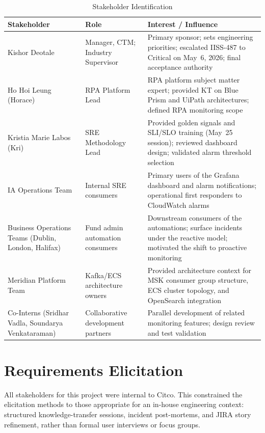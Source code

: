 \begin{table}[ht]
\centering
\caption{Stakeholder Identification}
\label{tab:stakeholders}
\begin{tabular}{p{3.8cm}p{3.0cm}p{5.5cm}}
\toprule
\textbf{Stakeholder} & \textbf{Role} & \textbf{Interest / Influence} \\
\midrule
Kishor Deotale & Manager, CTM; Industry Supervisor & Primary sponsor; sets engineering priorities; escalated IISS-487 to Critical on May~6, 2026; final acceptance authority \\
\midrule
Ho Hoi Leung (Horace) & RPA Platform Lead & RPA platform subject matter expert; provided KT on Blue Prism and UiPath architectures; defined RPA monitoring scope \\
\midrule
Kristia Marie Labos (Kri) & SRE Methodology Lead & Provided golden signals and SLI/SLO training (May~25 session); reviewed dashboard design; validated alarm threshold selection \\
\midrule
IA Operations Team & Internal SRE consumers & Primary users of the Grafana dashboard and alarm notifications; operational first responders to CloudWatch alarms \\
\midrule
Business Operations Teams (Dublin, London, Halifax) & Fund admin automation consumers & Downstream consumers of the automations; surface incidents under the reactive model; motivated the shift to proactive monitoring \\
\midrule
Meridian Platform Team & Kafka/ECS architecture owners & Provided architecture context for MSK consumer group structure, ECS cluster topology, and OpenSearch integration \\
\midrule
Co-Interns (Sridhar Vadla, Soundarya Venkataraman) & Collaborative development partners & Parallel development of related monitoring features; design review and test validation \\
\bottomrule
\end{tabular}
\end{table}

\section{Requirements Elicitation}
\label{sec:requirements_elicitation}

All stakeholders for this project were internal to Citco. This
constrained the elicitation methods to those appropriate for an
in-house engineering context: structured knowledge-transfer sessions,
incident post-mortems, and JIRA story refinement, rather than formal
user interviews or focus groups.

